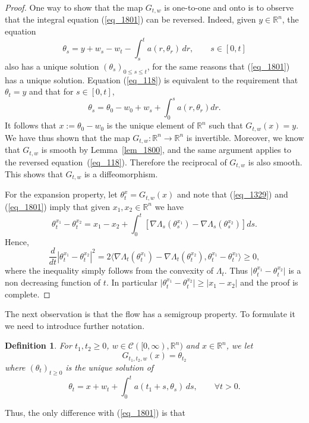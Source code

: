 \documentclass[12pt,a4paper]{article}
\newcommand{\RR}{\mathbb{R}}
\newcommand{\R}{\mathbb{R}}
\newtheorem{definition}[theorem]{Definition}
\theoremstyle{definition}
\begin{document}
\begin{proof} One way to show that the map $G_{t,w}$
is one-to-one and onto is to observe that the integral equation (\ref{eq_1801}) can be reversed. Indeed, given $y \in \R^n$, the equation
\begin{equation}\label{eq_118}
\theta_s = y + w_s - w_t - \int_s^t a (r, \theta_r ) \, dr ,
\qquad s \in [0,t]
\end{equation}
also has a unique solution $(\theta_s)_{0 \leq s \leq t}$, for the same reasons that (\ref{eq_1801})
has a unique solution. Equation (\ref{eq_118}) is equivalent to the requirement that $\theta_t = y$ and that for $s \in [0,t]$,
$$ \theta_s = \theta_0 - w_0 + w_s + \int_0^s a(r, \theta_r) dr. $$
 It follows that $x:=\theta_0 - w_0$ is the
unique element of $\R^n$ such that $G_{t,w} (x) = y$. We have thus shown that the map $G_{t,w}: \RR^n \rightarrow \RR^n$ is invertible. 
Moreover, we know that $G_{t,w}$ is smooth by Lemma~\ref{lem_1800}, and the same argument applies to the
reversed equation~(\ref{eq_118}). Therefore the reciprocal of $G_{t,w}$
is also smooth. This shows that $G_{t,w}$ is
a diffeomorphism.

\medskip
For the expansion property, let $\theta_t^{x} = G_{t,w} (x)$ and
note that (\ref{eq_1329}) and (\ref{eq_1801}) imply that given $x_1,x_2\in \R^n$ we have
\[
\theta_t^{x_1} - \theta_t^{x_2} = x_1 - x_2 + \int_0^t \left[ \nabla \Lambda_s( \theta_s^{x_1}) - \nabla \Lambda_s( \theta_s^{x_2} ) \right] ds.
\]
Hence,
\[
\frac{d}{dt} \left\vert \theta_t^{x_1} - \theta_t^{x_2} \right\vert^2
= 2 \langle \nabla \Lambda_t( \theta_t^{x_1}) - \nabla \Lambda_t( \theta_t^{x_2} ) , \theta_t^{x_1}  - \theta_t^{x_2}  \rangle \geq 0,
\]
where the inequality simply follows from the convexity of $\Lambda_t$.
Thus $\vert  \theta_t^{x_1}  - \theta_t^{x_2}   \vert$ is a non decreasing
function of $t$. In particular
$\vert \theta_t^{x_1}  - \theta_t^{x_2}   \vert \geq \vert x_1 -x_2\vert$
and the proof is complete. 
\end{proof}
%
The next observation is that the flow has a semigroup property.
To formulate it we need to introduce further notation.
%
\begin{definition}
For $t_1,t_2\geq0$, $w\in \mathcal C ([0,\infty), \R^n)$ and $x\in \R^n$,
we let
\[
G_{t_1,t_2,w} (x) = \theta_{t_2}
\]
where $(\theta_t)_{t \geq 0}$ is the unique solution of
\[
\theta_t = x + w_t + \int_0^t a ( t_1 + s , \theta_s ) \, ds ,\qquad \forall t > 0.
\]
\end{definition}
%
Thus, the only difference with (\ref{eq_1801}) is that
\end{document}
